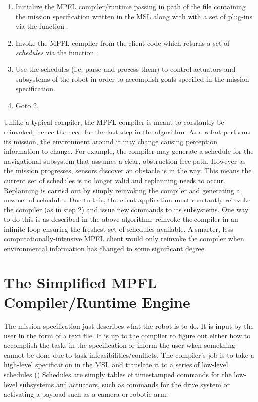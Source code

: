 \begin{enumerate}
\item Initialize the MPFL compiler/runtime passing in path of the file containing the mission specification written in the MSL along with with a set of plug-ins via the function .
\item Invoke the MPFL compiler from the client code which returns a set of \emph{schedules} via the function .
\item Use the schedules (i.e. parse and process them) to control actuators and subsystems of the robot in order to accomplish goals specified in the mission specification.
\item Goto 2.
\end{enumerate}

\begin{flushleft}
Unlike a typical compiler, the MPFL compiler is meant to constantly be reinvoked, hence the need for the last step in the algorithm. As a robot performs its mission, the environment around it may change causing perception information to change. For example, the compiler may generate a schedule for the navigational subsystem that assumes a clear, obstruction-free path. However as the mission progresses, sensors discover an obstacle is in the way. This means the current set of schedules is no longer valid and replanning needs to occur. Replanning is carried out by simply reinvoking the compiler and generating a new set of schedules. Due to this, the client application must constantly reinvoke the compiler (as in step 2) and issue new commands to its subsystems. One way to do this is as described in the above algorithm; reinvoke the compiler in an infinite loop ensuring the freshest set of schedules available. A smarter, less computationally-intensive MPFL client would only reinvoke the compiler when environmental information has changed to some significant degree.
\end{flushleft}

\section{The Simplified MPFL Compiler/Runtime Engine}
The mission specification just describes what the robot is to do. It is input by the user in the form of a text file. It is up to the compiler to figure out either how to accomplish the tasks in the specification or inform the user when something cannot be done due to task infeasibilities/conflicts. The compiler's job is to take a high-level specification in the MSL and translate it to a series of low-level schedules () Schedules are simply tables of timestamped commands for the low-level subsystems and actuators, such as commands for the drive system or activating a payload such as a camera or robotic arm.

